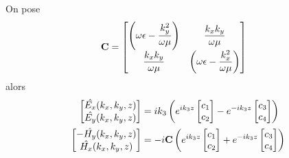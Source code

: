     \begin{prop}
        On pose 
        \begin{align}
            \mathbf{C} &=
            \begin{bmatrix}
                \left(\omega\epsilon-\dfrac{k_y^2}{\omega\mu}\right) & \dfrac{k_xk_y}{\omega\mu}\\
                \dfrac{k_xk_y}{\omega\mu} & \left(\omega\epsilon-\dfrac{k_x^2}{\omega\mu}\right)
            \end{bmatrix}
        \end{align}
        alors 
        \begin{subequations}
            \begin{align}
                \begin{bmatrix}
                    \hat{E_x}(k_x,k_y,z)\\
                    \hat{E_y}(k_x,k_y,z)\\
                \end{bmatrix}
                &=ik_3\left( e^{ik_3 z}
                \begin{bmatrix}
                    c_1 \\
                    c_2
                \end{bmatrix}
                -e^{-ik_3 z}
                \begin{bmatrix}
                    c_3 \\
                    c_4
                \end{bmatrix}
                \right)
                \label{eq:imp_fourier:plan:generale_E}
                \\
                \begin{bmatrix}
                    -\hat{H_y}(k_x,k_y,z)\\
                    \hat{H_x}(k_x,k_y,z)\\
                \end{bmatrix}
                &=-i
                \mathbf{C}
                \left(
                    e^{ik_3 z}
                    \begin{bmatrix}
                        c_1 \\
                        c_2
                    \end{bmatrix}
                    +e^{-ik_3 z}
                    \begin{bmatrix}
                        c_3 \\
                        c_4
                    \end{bmatrix}
                \right)
                \label{eq:imp_fourier:plan:generale_H}
            \end{align}
        \end{subequations}
    \end{prop}

